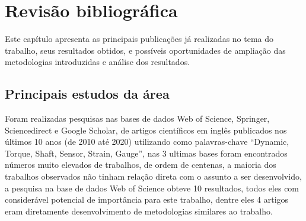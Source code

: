



\chapter{Revisão bibliográfica}%

Este capítulo apresenta as principais publicações já realizadas no tema do trabalho,
seus resultados obtidos, e possíveis oportunidades de ampliação das metodologias introduzidas e análise dos resultados.

\section{Principais estudos da área}

Foram realizadas pesquisas nas bases de dados Web of Science, Springer, Sciencedirect e Google Scholar, de artigos científicos em inglês publicados nos últimos 10 anos (de 2010 até 2020) utilizando como palavras-chave “Dynamic, Torque, Shaft, Sensor, Strain, Gauge”, nas 3 ultimas bases foram encontrados números muito elevados de trabalhos, de ordem de centenas, a maioria dos trabalhos observados não tinham relação direta com o assunto a ser desenvolvido, a pesquisa na base de dados Web of Science obteve 10 resultados, todos eles com considerável potencial de importância para este trabalho, dentre eles 4 artigos eram diretamente desenvolvimento de metodologias similares ao trabalho. %

